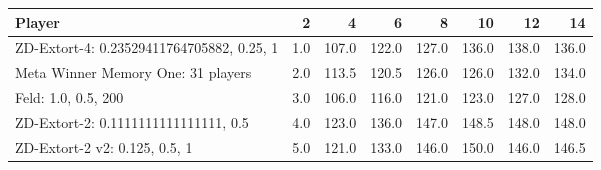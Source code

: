 \begin{tabular}{lrrrrrrr}
\toprule
                                    Player &    2 &      4 &      6 &      8 &     10 &     12 &     14 \\
\midrule
 ZD-Extort-4: 0.23529411764705882, 0.25, 1 &  1.0 &  107.0 &  122.0 &  127.0 &  136.0 &  138.0 &  136.0 \\
        Meta Winner Memory One: 31 players &  2.0 &  113.5 &  120.5 &  126.0 &  126.0 &  132.0 &  134.0 \\
                       Feld: 1.0, 0.5, 200 &  3.0 &  106.0 &  116.0 &  121.0 &  123.0 &  127.0 &  128.0 \\
      ZD-Extort-2: 0.1111111111111111, 0.5 &  4.0 &  123.0 &  136.0 &  147.0 &  148.5 &  148.0 &  148.0 \\
             ZD-Extort-2 v2: 0.125, 0.5, 1 &  5.0 &  121.0 &  133.0 &  146.0 &  150.0 &  146.0 &  146.5 \\
\bottomrule
\end{tabular}
